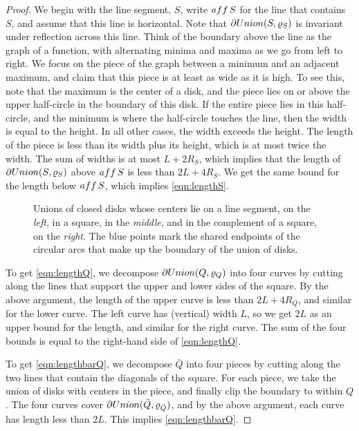 \documentclass[a4paper]{article}
\newcommand {\mm}[1]   {\ifmmode{#1}\else{\mbox{\(#1\)}}\fi}
\newcommand{\Union}[2]      {\mm{\rm Union}{({#1},{#2})}}
\newcommand{\affine}[1]     {\mm{\rm aff\,}{#1}}
\theoremstyle{definition}
\numberwithin{theorem}{section}
\numberwithin{equation}{section}
\begin{document}
\begin{proof}
  We begin with the line segment, $S$, write $\affine{S}$ for the line that contains $S$, and assume that this line is horizontal.
  Note that $\partial \Union{S}{\varrho_S}$ is invariant under reflection across this line.
  Think of the boundary above the line as the graph of a function, with alternating minima and maxima as we go from left to right.
  We focus on the piece of the graph between a minimum and an adjacent maximum, and claim that this piece is at least as wide as it is high.
  To see this, note that the maximum is the center of a disk, and the piece lies on or above the upper half-circle in the boundary of this disk.
  If the entire piece lies in this half-circle, and the minimum is where the half-circle touches the line, then the width is equal to the height.
  In all other cases, the width exceeds the height.
  The length of the piece is less than its width plus its height, which is at most twice the width.
  The sum of widths is at most $L+2R_S$, which implies that the length of $\partial \Union{S}{\varrho_S}$ above $\affine{S}$ is less than $2L + 4R_S$.
  We get the same bound for the length below $\affine{S}$, which implies \eqref{eqn:lengthS}.
  \begin{figure}[htb]
    \centering \vspace{0.0in}
    \resizebox{!}{1.6in}{}
    \caption{Unions of closed disks whose centers lie on a line segment, on the \emph{left}, in a square, in the \emph{middle}, and in the complement of a square, on the \emph{right}.
    The blue points mark the shared endpoints of the circular arcs that make up the boundary of the union of disks.}
    \label{fig:unions}
  \end{figure}
  
  To get \eqref{eqn:lengthQ}, we decompose $\partial \Union{Q}{\varrho_Q}$ into four curves by cutting along the lines that support the upper and lower sides of the square.
  By the above argument, the length of the upper curve is less than $2L+4R_Q$, and similar for the lower curve.
  The left curve has (vertical) width $L$, so we get $2L$ as an upper bound for the length, and similar for the right curve.
  The sum of the four bounds is equal to the right-hand side of \eqref{eqn:lengthQ}.
  
  \medskip
  To get \eqref{eqn:lengthbarQ}, we decompose $\bar{Q}$ into four pieces by cutting along the two lines that contain the diagonals of the square.
  For each piece, we take the union of disks with centers in the piece, and finally clip the boundary to within $Q$.
  The four curves cover $\partial \Union{\bar{Q}}{\varrho_{\bar{Q}}}$, and by the above argument, each curve has length less than $2L$.
  This implies \eqref{eqn:lengthbarQ}.
\end{proof}
\end{document}
